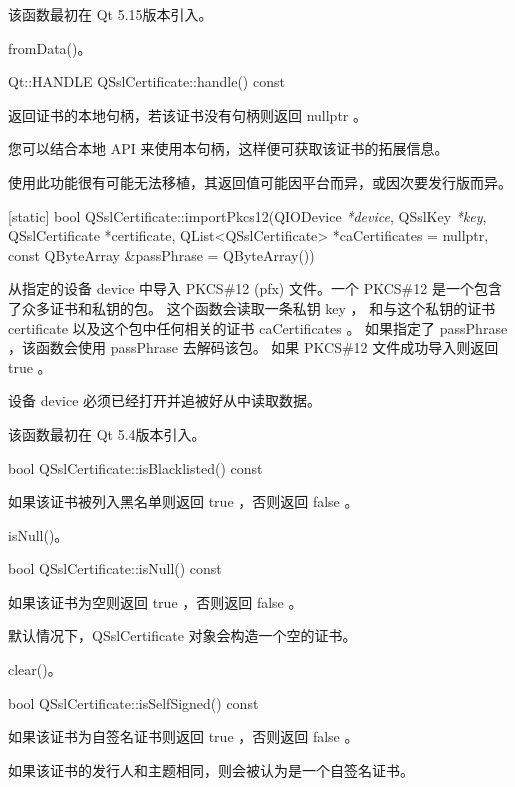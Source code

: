 该函数最初在 Qt 5.15版本引入。

\begin{seeAlso}
fromData()。
\end{seeAlso}

Qt::HANDLE QSslCertificate::handle() const

返回证书的本地句柄，若该证书没有句柄则返回 nullptr 。

您可以结合本地 API 来使用本句柄，这样便可获取该证书的拓展信息。

\begin{warning}
使用此功能很有可能无法移植，其返回值可能因平台而异，或因次要发行版而异。
\end{warning}

[static] bool QSslCertificate::importPkcs12(QIODevice \emph{*device}, 
QSslKey \emph{*key}, QSslCertificate *certificate, QList<QSslCertificate> *caCertificates = nullptr, const QByteArray \&passPhrase = QByteArray())

从指定的设备 device 中导入 PKCS\#12 (pfx) 文件。一个 PKCS\#12 是一个包含了众多证书和私钥的包。
这个函数会读取一条私钥 key ，
和与这个私钥的证书 certificate 以及这个包中任何相关的证书 caCertificates 。
 如果指定了 passPhrase ，该函数会使用 passPhrase 去解码该包。
 如果 PKCS\#12 文件成功导入则返回 true 。

 \begin{notice}
	设备 device 必须已经打开并追被好从中读取数据。
 \end{notice}

该函数最初在 Qt 5.4版本引入。

bool QSslCertificate::isBlacklisted() const

如果该证书被列入黑名单则返回 true ，否则返回 false 。

\begin{seeAlso}
isNull()。
\end{seeAlso}

bool QSslCertificate::isNull() const

如果该证书为空则返回 true ，否则返回 false 。

默认情况下，QSslCertificate 对象会构造一个空的证书。

\begin{seeAlso}
clear()。
\end{seeAlso}

bool QSslCertificate::isSelfSigned() const

如果该证书为自签名证书则返回 true ，否则返回 false 。

如果该证书的发行人和主题相同，则会被认为是一个自签名证书。

